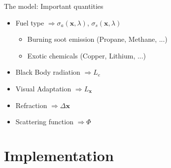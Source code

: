 \documentclass{beamer}
\newcommand{\x}{\mathbf{x}}
\begin{document}
\begin{frame}{The model: Important quantities}

\begin{itemize}
\setlength\itemsep{0.5em}
\item Fuel type $\Rightarrow \sigma_a (\x, \lambda)$, $\sigma_s (\x, \lambda)$
	\begin{itemize}
	\setlength\itemsep{0.5em}
	\item Burning soot emission (Propane, Methane, ...)
	\item Exotic chemicals (Copper, Lithium, ...)
	\end{itemize}
\item Black Body radiation $\Rightarrow L_e$
\item Visual Adaptation $\Rightarrow L_{\x}$
\item {\color{darker-gray} Refraction $\Rightarrow \Delta\x$}
\item {\color{darker-gray} Scattering function $\Rightarrow  \Phi$}
\end{itemize}

\end{frame}

\section{Implementation}
\subsection{ }
\end{document}

